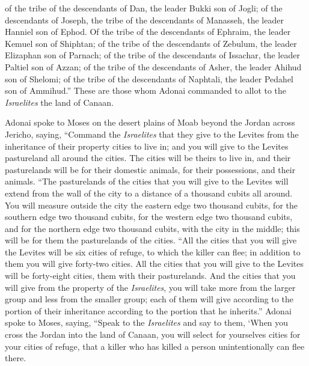 \begin{biblechapter}
\verse of the tribe of the descendants of Dan, the leader Bukki son of Jogli;
\verse of the descendants of Joseph, the tribe of the descendants of Manasseh, the leader Hanniel son of Ephod.
\verse Of the tribe of the descendants of Ephraim, the leader Kemuel son of Shiphtan;
\verse of the tribe of the descendants of Zebulum, the leader Elizaphan son of Parnach;
\verse of the tribe of the descendants of Issachar, the leader Paltiel son of Azzan;
\verse of the tribe of the descendants of Asher, the leader Ahihud son of Shelomi;
\verse of the tribe of the descendants of Naphtali, the leader Pedahel son of Ammihud.”
\verse These are those whom Adonai commanded to allot to the \textit{Israelites} the land of Canaan.
\end{biblechapter}

\begin{biblechapter} %
 Adonai spoke to Moses on the desert plains of Moab beyond the Jordan across Jericho, saying,
\verse “Command the \textit{Israelites} that they give to the Levites from the inheritance of their property cities to live in; and you will give to the Levites pastureland all around the cities.
\verse The cities will be theirs to live in, and their pasturelands will be for their domestic animals, for their possessions, and their animals.
\verse “The pasturelands of the cities that you will give to the Levites will extend from the wall of the city to a distance of a thousand cubits all around.
\verse You will measure outside the city the eastern edge two thousand cubits, for the southern edge two thousand cubits, for the western edge two thousand cubits, and for the northern edge two thousand cubits, with the city in the middle; this will be for them the pasturelands of the cities.
\verse “All the cities that you will give the Levites will be six cities of refuge, to which the killer can flee; in addition to them you will give forty-two cities.
\verse All the cities that you will give to the Levites will be forty-eight cities, them with their pasturelands.
\verse And the cities that you will give from the property of the \textit{Israelites}, you will take more from the larger group and less from the smaller group; each of them will give according to the portion of their inheritance according to the portion that he inherits.”
 Adonai spoke to Moses, saying,
\verse “Speak to the \textit{Israelites} and say to them, ‘When you cross the Jordan into the land of Canaan,
\verse you will select for yourselves cities for your cities of refuge, that a killer who has killed a person unintentionally can flee there.

\end{biblechapter}
